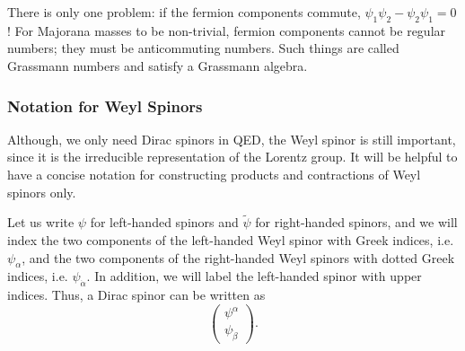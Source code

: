 \documentclass[11pt]{article}
\theoremstyle{definition}
\begin{document}
There is only one problem: if the fermion components commute, \(\psi_1 \psi_2 - \psi_2 \psi_1 = 0\)! For Majorana masses to be non-trivial, fermion components cannot be regular numbers; they must be anticommuting numbers. Such things are called Grassmann numbers and satisfy a Grassmann algebra.

\subsubsection{Notation for Weyl Spinors}
Although, we only need Dirac spinors in QED, the Weyl spinor is still important, since it is the irreducible representation of the Lorentz group. It will be helpful to have a concise notation for constructing products and contractions of Weyl spinors only. 

Let us write $\psi$ for left-handed spinors and $\tilde{\psi}$ for right-handed spinors, and we will index the two components of the left-handed Weyl spinor with Greek indices, i.e. $\psi_\alpha$, and the two components of the right-handed Weyl spinors with dotted Greek indices, i.e. $\psi_{\dot{\alpha}}$. In addition, we will label the left-handed spinor with upper indices. Thus, a Dirac spinor can be written as
\begin{equation}
    \begin{pmatrix}
        \psi^\alpha\\
        \psi_{\dot{\beta}}
    \end{pmatrix}.
\end{equation}
\end{document}
